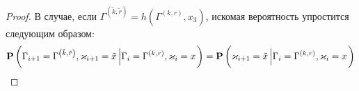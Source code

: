 \documentclass[a4paper,12pt,russian]{extarticle}
\newcommand{\G}{\Gamma}
\newcommand{\ga}[1]{\Gamma^{\left( #1 \right)} }
\renewcommand{\Pr}{{\mathbf P}}
\renewcommand{\P}[2]{\Pr\left( #1 \left| #2\right.\right)}
\begin{document}
\begin{proof}
В случае, если $\ga{\tilde{k},\tilde{r}}=h(\ga{k,r},x_3)$, искомая вероятность упростится следующим образом:
\begin{equation*}
\P{\G_{i+1}=\ga{\tilde{k},\tilde{r}},\vk_{i+1}=\tilde{x}}{\G_{i}=\ga{k,r},\vk_i=x} 
=\P{\vk_{i+1}=\tilde{x}}{\G_{i}=\ga{k,r},\vk_i=x} 
\end{equation*}


\end{proof}
\end{document}
